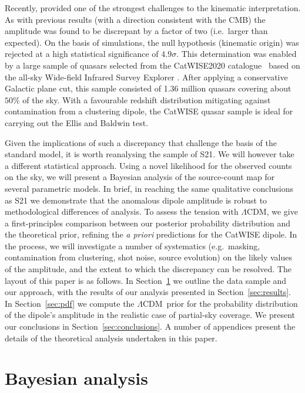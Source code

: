 \documentclass[fleqn,usenatbib]{mnras}
\def\LCDM{$\Lambda$CDM}
\begin{document}
Recently, \citet[][hereafter S21]{2021ApJ...908L..51S} provided one of the strongest
challenges to the kinematic interpretation. As with previous results (with
a direction consistent with the CMB) the amplitude was found to be
discrepant by a factor of two (i.e.~larger than expected).
On the basis of simulations, the null hypothesis (kinematic origin) was rejected at a high statistical significance of $4.9\sigma$.
This determination was enabled by a large sample of quasars selected from
the CatWISE2020
catalogue~\citep{CatWISE2020} based on the all-sky
Wide-field Infrared Survey Explorer \citep[WISE;][]{WISE}.
After applying a conservative Galactic plane cut,
this sample consisted of 1.36 million quasars covering about $50\%$ of the sky. With a favourable redshift distribution mitigating against contamination from a clustering dipole, the CatWISE quasar
sample is ideal for carrying out the Ellis and Baldwin test.

Given the implications of such a discrepancy that challenge the
basis of the standard model, it is worth reanalysing the sample of S21.
We will however take a different statistical approach.
Using a novel likelihood for the observed counts on the sky, we will
present a Bayesian analysis of the source-count map for several
parametric models.
In brief, in reaching the same qualitative conclusions as S21 we demonstrate that
the anomalous dipole amplitude is robust to methodological differences
of analysis. To assess the tension with \LCDM, we
give a first-principles comparison between our posterior
probability distribution and the theoretical prior, refining
the {\it a priori} predictions for the CatWISE dipole. In the process,
we will investigate a number of systematics (e.g.~masking, contamination
from clustering, shot noise, source evolution) on the likely values of the amplitude,
and the extent to which the discrepancy can be resolved.
The layout of this paper is as follows.
In Section~\ref{sec:approach} we outline the data sample and our approach, with the results
of our analysis presented in Section~\ref{sec:results}.
In Section~\ref{sec:pdf} we 
compute the \LCDM~prior for the probability distribution of the dipole's amplitude in the
realistic case of partial-sky coverage. We present our conclusions in
Section~\ref{sec:conclusions}. A number of appendices present the
details of the theoretical analysis undertaken in this paper.

\section{Bayesian analysis}\label{sec:approach}
\end{document}
